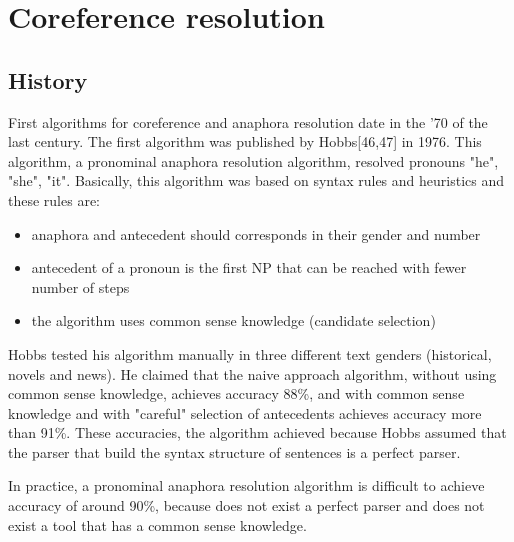 \chapter{Coreference resolution}
\label{chapter:Coreference resolution}
\section{History}

First algorithms for coreference and anaphora resolution date in the '70 of the last century. The first algorithm was published by Hobbs[46,47] in 1976. This algorithm, a pronominal anaphora resolution algorithm, resolved pronouns "he", "she",  "it". Basically, this algorithm was based on syntax rules and heuristics and these rules are:

\begin{itemize}
	\item anaphora and antecedent should corresponds in their gender and number
	\item antecedent of a pronoun is the first NP that can be reached with fewer number of steps
	\item the algorithm uses common sense knowledge (candidate selection)
\end{itemize}

Hobbs tested his algorithm manually in three different text genders (historical, novels and news). He claimed that the naive approach algorithm, without using common sense knowledge, achieves accuracy 88\%, and with common sense knowledge  and with "careful" selection of antecedents achieves accuracy more than 91\%. These accuracies, the algorithm achieved because Hobbs assumed that the parser that build the syntax structure of sentences is a perfect parser.   

In practice, a pronominal anaphora resolution algorithm is difficult to achieve accuracy of around 90\%, because does not exist a perfect parser and does not exist a tool that has a common sense knowledge.

